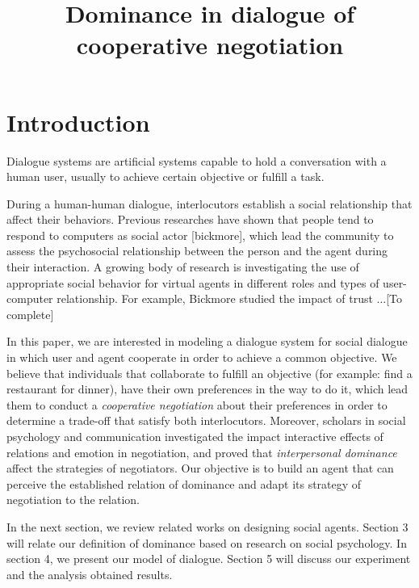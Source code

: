 \documentclass{llncs}
\begin{document}
						\title{\vskip -10pt Dominance in dialogue of cooperative negotiation}
						\maketitle
					\section{Introduction}
					Dialogue systems are artificial systems capable to hold a conversation with a human user, usually to achieve certain objective or fulfill a task.
					
					During a human-human dialogue, interlocutors establish a social relationship that affect their behaviors. Previous researches have shown that people tend to respond to computers as social actor [bickmore], which lead the community to assess the psychosocial relationship between the person and the agent during their interaction. 
					A growing body of research is investigating the use of appropriate social behavior for virtual agents in different roles and types of user-computer relationship.
					For example, Bickmore studied the impact of trust ...[To complete]
					
					
					In this paper, we are interested in modeling a dialogue system for social dialogue in which user and agent cooperate in order to achieve a common objective.  We believe that individuals that collaborate to fulfill an objective (for example: find a restaurant for dinner), have their own preferences in the way to do it, which lead them to conduct a \emph{cooperative negotiation} about their preferences in order to determine a trade-off that satisfy both interlocutors. Moreover, scholars in social psychology and communication investigated the impact interactive effects of relations and emotion in negotiation, and proved that  \emph{interpersonal dominance} affect the strategies of negotiators. Our objective is to build an agent that can perceive the established relation of dominance and adapt its strategy of negotiation to the relation. 
					
					In the next section, we review related works on designing social agents. Section 3 will relate our definition of dominance based on research on social psychology. In section 4, we present our model of dialogue. Section 5 will discuss our experiment and the analysis obtained results. 
				
					
\end{document}
